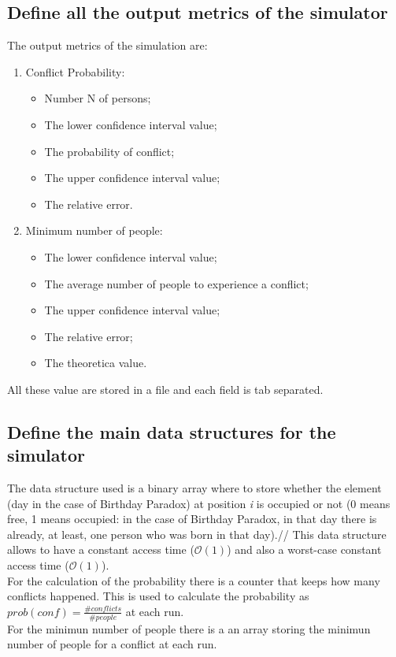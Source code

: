 \documentclass{report}
\begin{document}
{	\subsection{Define all the output metrics of the simulator}
			The output metrics of the simulation are:
			\begin{enumerate}
					\item Conflict Probability:
					\begin{itemize}
							\item Number N of persons;
							\item The lower confidence interval value;
							\item The probability of conflict;
							\item The upper confidence interval value;
							\item The relative error.
					\end{itemize}
					\item Minimum number of people:
					\begin{itemize}
							\item The lower confidence interval value;
							\item The average number of people to experience a conflict;
							\item The upper confidence interval value;
							\item The relative error;
							\item The theoretica value.
					\end{itemize}
			\end{enumerate}
			All these value are stored in a file and each field is tab separated.
	
	\subsection{Define the main data structures for the simulator}
				The data structure used is a binary array where to store whether the element (day in the case of Birthday Paradox) at position \emph{i} is occupied or not (0 means free, 1 means occupied: in the case of Birthday Paradox, in that day there is already, at least, one person who was born in that day).// This data structure allows to have a constant access time ($\mathcal{O}(1)$) and also a worst-case constant access time ($\mathcal{O}(1)$). \\
				For the calculation of the probability there is a counter that keeps how many conflicts happened. This is used to calculate the probability as $prob(conf)=\frac{\#conflicts}{\#people}$ at each run. \\
				For the minimun number of people there is a an array storing the minimun number of people for a conflict at each run.
			
}
\end{document}
